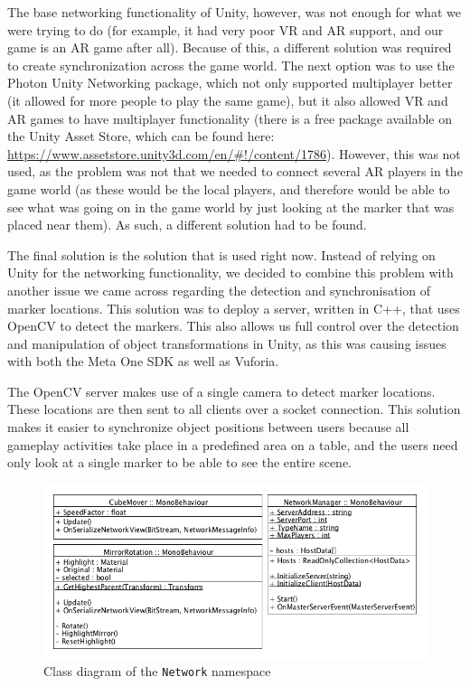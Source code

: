 			The base networking functionality of Unity, however, was not enough
			for what we were trying to do (for example, it had very poor VR and
			AR support, and our game is an AR game after all). Because of this,
			a different solution was required to create synchronization across
			the game world. The next option was to use the Photon Unity Networking
			package, which not only supported multiplayer better (it allowed for
			more people to play the same game), but it also allowed VR and AR games
			to have multiplayer functionality (there is a free package available
			on the Unity Asset Store, which can be found here: \url{https://www.assetstore.unity3d.com/en/#!/content/1786}). However,
			this was not used, as the problem was not that we needed to connect
			several AR players in the game world (as these would be the local players,
			and therefore would be able to see what was going on in the game world
			by just looking at the marker that was placed near them). As such,
			a different solution had to be found.
			
			The final solution is the solution that is used right now. Instead of 
			relying on Unity for the networking functionality, we decided to 
			combine this problem with another issue we came across regarding 
			the detection and synchronisation of marker locations. This solution
			was to deploy a server, written in C++, that uses OpenCV to detect 
			the markers. This also allows us full control over the detection and 
			manipulation of object transformations in Unity, as this was causing 
			issues with both the Meta One SDK as well as Vuforia.
			
			The OpenCV server makes use of a single camera to detect marker locations.
			These locations are then sent to all clients over a socket connection.
			This solution makes it easier to synchronize object positions between users
			because all gameplay activities take place in a predefined area on a table,
			and the users need only look at a single marker to be able to see the 
			entire scene. 
			
			\begin{figure}[ht]
				\includegraphics[width=\textwidth]{ClassDiagramNetwork}
				\caption{Class diagram of the \texttt{Network} namespace}
				\label{fig:classdiagramnetwork}
			\end{figure}
			
